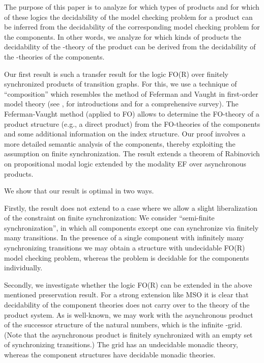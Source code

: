 \documentclass{LMCS}
\begin{document}
The purpose of this paper is to analyze for which types of products 
and for which of these logics 
the decidability of the model checking problem for a  
product can be inferred from the 
decidability of the corresponding model checking problem for the components. 
In other words, we analyze for which kinds of products the decidability 
of the -theory of the product can be derived from the 
decidability of the -theories of the components. 

Our first result is such a transfer result for the logic FO(R) over 
finitely synchronized products of transition graphs. For this, we 
use a technique of ``composition'' which resembles the method of 
Feferman and Vaught \cite{fv59} in first-order model theory 
(see 
\cite{ck73}, \cite{hodg93} for introductions and \cite{Ma04} for 
a comprehensive survey). The Feferman-Vaught method (applied to FO) 
allows 
to determine the FO-theory of a product structure (e.g., 
a direct product) from the FO-theories of the components and 
some additional information on the index structure. Our proof involves 
a more detailed semantic analysis of the components, thereby exploiting the 
assumption on finite synchronization. The result 
extends a theorem of Rabinovich \cite{rabino07} on propositional modal 
logic extended by the modality EF over asynchronous products.

We show that our result is optimal in two ways.

Firstly, the result does not extend to a case where we allow a slight 
liberalization of the constraint on finite synchronization: We consider 
``semi-finite synchronization'', 
in which all components except one can synchronize via finitely many 
transitions. In the presence of a single component with infinitely many 
synchronizing transitions we may obtain a structure with undecidable 
FO(R) model checking problem, whereas the problem is decidable for the 
components individually. 
 
Secondly, we investigate whether the logic FO(R) can be extended in the 
above mentioned preservation result. For a strong extension like MSO
it is clear that decidability of the component theories does not carry over 
to the theory of the product system. As is well-known, we may work  with 
the asynchronous product of the successor structure of the natural 
numbers, which is the infinite -grid. 
(Note that the asynchronous product is finitely synchronized
with an empty set of synchronizing transitions.) The grid has an undecidable 
monadic theory, whereas the component structures have decidable monadic theories. 
\end{document}
